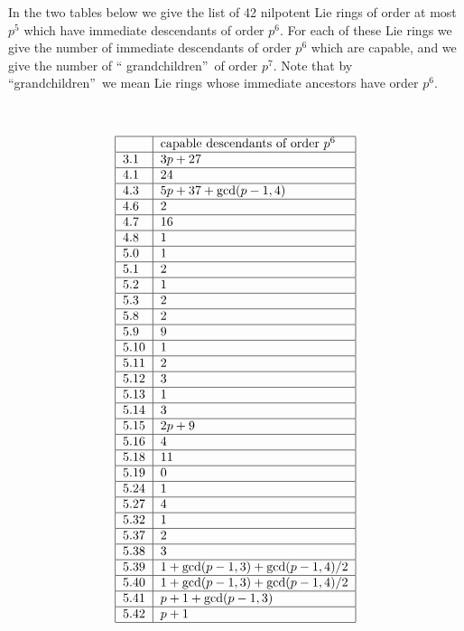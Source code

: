 \documentclass[10pt]{article}
\begin{document}
In the two tables below we give the list of 42 nilpotent Lie rings of order
at most $p^{5}$ which have immediate descendants of order $p^{6}$. For each
of these Lie rings we give the number of immediate descendants of order $%
p^{6}$ which are capable, and we give the number of \textquotedblleft
grandchildren\textquotedblright\ of order $p^{7}$. Note that by
\textquotedblleft grandchildren\textquotedblright\ we mean Lie rings whose
immediate ancestors have order $p^{6}$.

{\ }

{\small 
\[
\begin{tabular}{|l|l|}
\hline
& capable descendants of order $p^{6}$ \\ \hline
3.1 & $3p+27$ \\ \hline
4.1 & $24$ \\ \hline
4.3 & $5p+37+\gcd (p-1,4)$ \\ \hline
4.6 & $2$ \\ \hline
4.7 & $16$ \\ \hline
4.8 & $1$ \\ \hline
5.0 & $1$ \\ \hline
5.1 & $2$ \\ \hline
5.2 & $1$ \\ \hline
5.3 & $2$ \\ \hline
5.8 & $2$ \\ \hline
5.9 & $9$ \\ \hline
5.10 & $1$ \\ \hline
5.11 & $2$ \\ \hline
5.12 & $3$ \\ \hline
5.13 & $1$ \\ \hline
5.14 & $3$ \\ \hline
5.15 & $2p+9$ \\ \hline
5.16 & $4$ \\ \hline
5.18 & $11$ \\ \hline
5.19 & $0$ \\ \hline
5.24 & $1$ \\ \hline
5.27 & $4$ \\ \hline
5.32 & $1$ \\ \hline
5.37 & $2$ \\ \hline
5.38 & $3$ \\ \hline
5.39 & $1+\gcd (p-1,3)+\gcd (p-1,4)/2$ \\ \hline
5.40 & $1+\gcd (p-1,3)+\gcd (p-1,4)/2$ \\ \hline
5.41 & $p+1+\gcd (p-1,3)$ \\ \hline
5.42 & $p+1$ \\ \hline

\end{tabular}\]}
\end{document}
